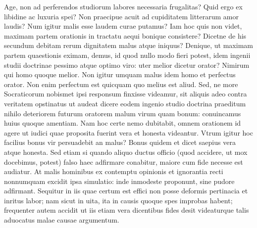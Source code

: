 Age, non ad perferendos studiorum labores necessaria frugalitas? Quid ergo ex libidine ac luxuria spei? Non praecipue acuit ad cupiditatem litterarum amor laudis? Num igitur malis esse laudem curae putamus? Iam hoc quis non videt, maximam partem orationis in tractatu aequi bonique consistere? Dicetne de his secundum debitam rerum dignitatem malus atque iniquus? Denique, ut maximam partem quaestionis eximam, demus, id quod nullo modo fieri potest, idem ingenii studii doctrinae pessimo atque optimo viro: uter melior dicetur orator? Nimirum qui homo quoque melior. Non igitur umquam malus idem homo et perfectus orator. Non enim perfectum est quicquam quo melius est aliud. Sed, ne more Socraticorum nobismet ipsi responsum finxisse videamur, sit aliquis adeo contra veritatem opstinatus ut audeat dicere eodem ingenio studio doctrina praeditum nihilo deteriorem futurum oratorem malum virum quam bonum: conuincamus huius quoque amentiam. Nam hoc certe nemo dubitabit, omnem orationem id agere ut iudici quae proposita fuerint vera et honesta videantur. Vtrum igitur hoc facilius bonus vir persuadebit an malus? Bonus quidem et dicet saepius vera atque honesta. Sed etiam si quando aliquo ductus officio (quod accidere, ut mox docebimus, potest) falso haec adfirmare conabitur, maiore cum fide necesse est audiatur. At malis hominibus ex contemptu opinionis et ignorantia recti nonnumquam excidit ipsa simulatio: inde inmodeste proponunt, sine pudore adfirmant. Sequitur in iis quae certum est effici non posse deformis pertinacia et inritus labor; nam sicut in uita, ita in causis quoque spes improbas habent; frequenter autem accidit ut iis etiam vera dicentibus fides desit videaturque talis aduocatus malae causae argumentum.

